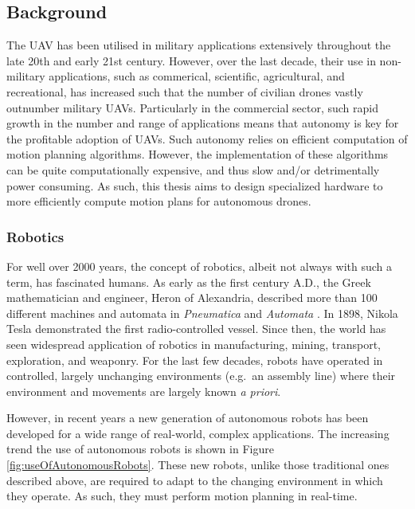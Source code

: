 
\subsection{Background}
    
    The \gls{UAV} has been utilised in military applications extensively throughout the late 20th and early 21st century. However, over the last decade, their use in non-military applications, such as commerical, scientific, agricultural, and recreational, has increased such that the number of civilian drones vastly outnumber military \gls{UAV}s. Particularly in the commercial sector, such rapid growth in the number and range of applications means that autonomy is key for the profitable adoption of \gls{UAV}s. Such autonomy relies on efficient computation of motion planning algorithms. However, the implementation of these algorithms can be quite computationally expensive, and thus slow and/or detrimentally power consuming. As such, this thesis aims to design specialized hardware to more efficiently compute motion plans for autonomous drones.

    \subsubsection*{Robotics}
        For well over 2000 years, the concept of robotics, albeit not always with such a term, has fascinated humans. As early as the first century A.D., the Greek mathematician and engineer, Heron of Alexandria, described more than 100 different machines and \gls{automata} in \textit{Pneumatica} and \textit{Automata} \cite{Alexandrinus}. In 1898, Nikola Tesla demonstrated the first radio-controlled vessel. Since then, the world has seen widespread application of robotics in manufacturing, mining, transport, exploration, and weaponry. For the last few decades, robots have operated in controlled, largely unchanging environments (e.g.\ an assembly line) where their environment and movements are largely known \textit{\gls{a priori}}.

        However, in recent years a new generation of autonomous robots has been developed for a wide range of real-world, complex applications. The increasing trend the use of autonomous robots is shown in Figure \ref{fig:useOfAutonomousRobots}. These new robots, unlike those traditional ones described above, are required to adapt to the changing environment in which they operate. As such, they must perform motion planning in \gls{real-time}.

